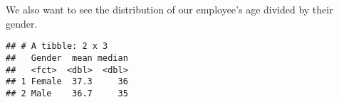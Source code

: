 \documentclass[
]{article}
\newenvironment{Shaded}{\begin{snugshade}}{\end{snugshade}}
\newcommand{\DataTypeTok}[1]{\textcolor[rgb]{0.13,0.29,0.53}{#1}}
\newcommand{\KeywordTok}[1]{\textcolor[rgb]{0.13,0.29,0.53}{\textbf{#1}}}
\newcommand{\NormalTok}[1]{#1}
\newcommand{\OperatorTok}[1]{\textcolor[rgb]{0.81,0.36,0.00}{\textbf{#1}}}
\newcommand{\StringTok}[1]{\textcolor[rgb]{0.31,0.60,0.02}{#1}}
\begin{document}
We also want to see the distribution of our employee's age divided by
their gender.

\begin{Shaded}
\end{Shaded}

\begin{verbatim}
## # A tibble: 2 x 3
##   Gender  mean median
##   <fct>  <dbl>  <dbl>
## 1 Female  37.3     36
## 2 Male    36.7     35
\end{verbatim}
\end{document}
